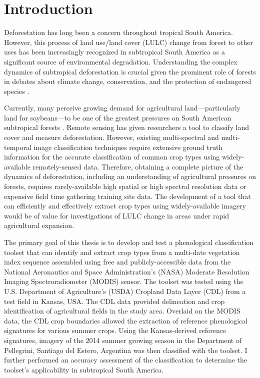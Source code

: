 \chapter{Introduction}
\label{intro}

Deforestation has long been a concern throughout tropical South America. However, this process of land use/land cover (LULC) change from forest to other uses has been increasingly recognized in subtropical South America as a significant source of environmental degradation. Understanding the complex dynamics of subtropical deforestation is crucial given the prominent role of forests in debates about climate change, conservation, and the protection of endangered species \autocites{geist2002proximate}{zak2004do-subtropical}{bonnie2000counting}{houghton1994the-worldwide}{sala2000global}.

Currently, many perceive growing demand for agricultural land---particularly land for soybeans---to be one of the greatest pressures on South American subtropical forests \autocites{pengue2005transgenic}{grau2005agriculture}{altieri2006gm-soybean:}. Remote sensing has given researchers a tool to classify land cover and measure deforestation. However, existing multi-spectral and multi-temporal image classification techniques require extensive ground truth information for the accurate classification of common crop types using widely-available remotely-sensed data. Therefore, obtaining a complete picture of the dynamics of deforestation, including an understanding of agricultural pressures on forests, requires rarely-available high spatial or high spectral resolution data \autocite{senay2000using} or expensive field time gathering training site data. The development of a tool that can efficiently and effectively extract crop types using widely-available imagery would be of value for investigations of LULC change in areas under rapid agricultural expansion.

The primary goal of this thesis is to develop and test a phenological classification toolset that can identify and extract crop types from a multi-date vegetation index sequence assembled using free and publicly-accessible data from the National Aeronautics and Space Administration’s (NASA) Moderate Resolution Imaging Spectroradiometer (MODIS) sensor. The toolset was tested using the U.S. Department of Agriculture's (USDA) Cropland Data Layer (CDL) from a test field in Kansas, USA. The CDL data provided delineation and crop identification of agricultural fields in the study area. Overlaid on the MODIS data, the CDL crop boundaries allowed the extraction of reference phenological signatures for various summer crops. Using the Kansas-derived reference signatures, imagery of the 2014 summer growing season in the Department of Pellegrini, Santiago del Estero, Argentina was then classified with the toolset. I further performed an accuracy assessment of the classification to determine the toolset's applicability in subtropical South America.

